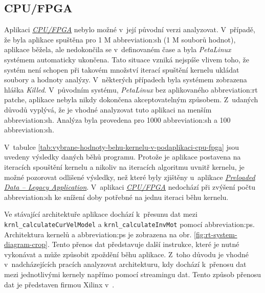 \documentclass[a4paper, twoside, 11pt]{article}
\begin{document}
	\subsection{CPU/FPGA}\label{subsec:poznatky-ziskane-profilovanim-aplikaci-cpu-fpga}
		Aplikaci \hyperref[subsec:cpu-fpga]{\textit{CPU/FPGA}} nebylo možné v~její původní verzi analyzovat. V~případě, že byla aplikace spuštěna pro 1 M \gls{abbreviation:sh} (1 M souborů hodnot), aplikace běžela, ale nedokončila se v~definovaném čase a byla \textit{PetaLinux} systémem automaticky ukončena. Tato situace vzniká nejspíše vlivem toho, že systém není schopen při takovém množství iterací spuštění kernelu ukládat soubory a hodnoty analýzy. V~některých případech byla systémem zobrazena hláška \textit{Killed}. V~původním systému, \textit{PetaLinux} bez aplikovaného \gls{abbreviation:rt} patche, aplikace nebyla nikdy dokončena akceptovatelným způsobem. Z~udaných důvodů vyplývá, že je vhodné analyzovat tuto aplikaci na menším \gls{abbreviation:sh}. Analýza byla provedena pro 1000 \gls{abbreviation:sh} a 100 \gls{abbreviation:sh}.\par
		V~tabulce \ref{tab:vybrane-hodnoty-behu-kernelu-v-podaplikaci-cpu-fpga} jsou uvedeny výsledky daných běhů programu. Protože je aplikace postavena na iteracích spouštění kernelu a nikoliv na iteracích algoritmu uvnitř kernelu, je možné pozorovat odlišené výsledky, než které byly zjištěny u~aplikace \hyperref[subsec:poznatky-ziskane-profilovanim-aplikaci-preloaded-data-legacy-application]{\textit{Preloaded Data – Legacy Application}}. V~aplikaci \hyperref[subsec:cpu-fpga]{\textit{CPU/FPGA}} nedochází při zvýšení počtu \gls{abbreviation:sh} ke snížení doby potřebné na jednu iteraci běhu kernelu.\par
		Ve stávající architektuře aplikace dochází k~přesunu dat mezi \texttt{ krnl\_calculateCurVelModel} a \texttt{krnl\_calculateInvMot} pomocí \gls{abbreviation:ps}. Architektura kernelů a \gls{abbreviation:ps} je zobrazena na obr. \ref{fig:rt-system-diagram-crop}. Tento přenos dat představuje další instrukce, které je nutné vykonávat a může způsobit zpoždění běhu aplikace. Z~toho důvodu je vhodné v~nadcházejících pracích analyzovat architekturu, kdy dochází k~přenosu dat mezi jednotlivými kernely napřímo pomocí streamingu dat. Tento způsob přenosu dat je představen firmou Xilinx v~\cite{xilinx-github-vitis-accel-examples-stream-free-running-kernel}.\par
\end{document}
